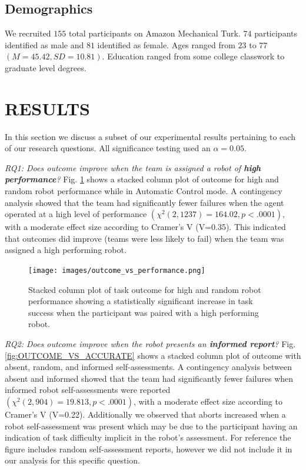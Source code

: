 \documentclass[aaai]{article}
\begin{document}
\subsection{Demographics}
We recruited $155$ total participants on Amazon Mechanical Turk. $74$ participants identified as male and $81$ identified as female. Ages ranged from $23$ to $77$ $(M=45.42, SD=10.81)$. Education ranged from some college classwork to graduate level degrees.

\section{RESULTS} \label{RESULTS}

In this section we discuss a subset of our experimental results pertaining to each of our research questions. All significance testing used an $\alpha = 0.05$.

\emph{RQ1: Does outcome improve when the team is assigned a robot of \textbf{high performance}?} Fig. \ref{fig:OUTCOME_VS_PERFORMANCE} shows a stacked column plot of outcome for high and random robot performance while in Automatic Control mode. A contingency analysis showed that the team had significantly fewer failures when the agent operated at a high level of performance $(\chi^2(2, 1237)=164.02, p<.0001)$, with a moderate effect size according to Cramer's V (V=0.35). This indicated that outcomes did improve (teams were less likely to fail) when the team was assigned a high performing robot.

\begin{figure}[htbp]
\centering
\texttt{[image: images/outcome\_vs\_performance.png]}
\caption{Stacked column plot of task outcome for high and random robot performance showing a statistically significant increase in task success when the participant was paired with a high performing robot.}
\label{fig:OUTCOME_VS_PERFORMANCE}
\end{figure}


\emph{RQ2: Does outcome improve when the robot presents an \textbf{informed report}?}  Fig. \ref{fig:OUTCOME_VS_ACCURATE} shows a stacked column plot of outcome with absent, random, and informed self-assessments. A contingency analysis between absent and informed showed that the team had significantly fewer failures when informed robot self-assessments were reported $(\chi^2(2, 904)= 19.813, p<.0001)$, with a moderate effect size according to Cramer's V (V=0.22). Additionally we observed that aborts increased when a robot self-assessment was present which may be due to the participant having an indication of task difficulty implicit in the robot's assessment. For reference the figure includes random self-assessment reports, however we did not include it in our analysis for this specific question.
\end{document}
